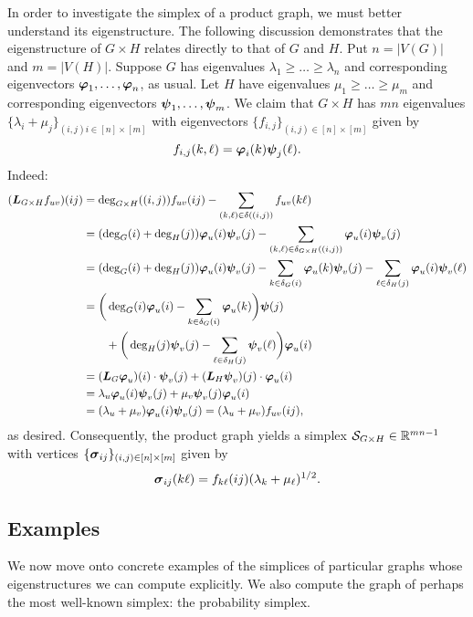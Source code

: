 In order to investigate the simplex of a product graph, we must better understand its eigenstructure. The following discussion demonstrates that the eigenstructure of $G\times H$ relates directly to that of $G$ and $H$. Put $n=|V(G)|$ and $m=|V(H)|$. Suppose $G$ has eigenvalues $\lambda_1\geq \dots\geq \lambda_{n}$ and corresponding eigenvectors $\vb*{\varphi}_1,\dots,\vb*{\varphi}_{n}$, as usual. Let $H$ have eigenvalues $\mu_1\geq \dots\geq \mu_{m}$ and corresponding eigenvectors $\vb*{\psi}_1,\dots,\vb*{\psi}_{m}$. 
We claim that $G\times H$ has $mn$ eigenvalues $\{\lambda_i+\mu_j\}_{(i,j)i\in[n]\times[m]}$ with eigenvectors $\{f_{i,j}\}_{(i,j)\in[n]\times[m]}$ given by 
\[f_{i,j}(k,\ell) = \vb*{\varphi}_i(k)\vb*{\psi}_j(\ell).\]
Indeed: 
\begin{align*}
(\vb*{L}_{G\times H} f_{uv})(ij) &= \deg_{G\times H}((i,j))f_{uv}(ij) - \sum_{(k,\ell)\in \delta((i,j))} f_{uv}(k\ell) \\
&= (\deg_G(i)+\deg_H(j))\vb*{\varphi}_u(i)\vb*{\psi}_v(j) - \sum_{(k,\ell)\in \delta_{G\times H}((i,j))} \vb*{\varphi}_u(i)\vb*{\psi}_v(j) \\
&= (\deg_G(i)+\deg_H(j))\vb*{\varphi}_u(i)\vb*{\psi}_v(j) - \sum_{k\in \delta_G(i)} \vb*{\varphi}_u(k)\vb*{\psi}_v(j) - \sum_{\ell\in \delta_H(j)} \vb*{\varphi}_u(i)\vb*{\psi}_v(\ell) \\
&=\bigg(\deg_G(i)\vb*{\varphi}_u(i) - \sum_{k\in\delta_G(i)}\vb*{\varphi}_u(k)\bigg)\vb*{\psi}(j) \\
&\qquad + \bigg(\deg_H(j)\vb*{\psi}_v(j)-\sum_{\ell\in\delta_H(j)}\vb*{\psi}_v(\ell)\bigg)\vb*{\varphi}_u(i) \\
&= (\vb*{L}_G \vb*{\varphi}_u)(i) \cdot \vb*{\psi}_v(j) + (\vb*{L}_H\vb*{\psi}_v)(j)\cdot \vb*{\varphi}_u(i) \\
&= \lambda_u\vb*{\varphi}_u(i) \vb*{\psi}_v(j) + \mu_v\vb*{\psi}_v(j)\vb*{\varphi}_u(i) \\
&= (\lambda_u+\mu_v)\vb*{\varphi}_u(i)\vb*{\psi}_v(j) = (\lambda_u+\mu_v)f_{uv}(ij),
\end{align*}
as desired. Consequently, the product graph yields a simplex $\mathcal{S}_{G\times H}\in\mathbb{R}^{mn-1}$ with vertices $\{\vb*{\sigma}_{ij}\}_{(i,j)\in[n]\times[m]}$ given by 
\[\vb*{\sigma}_{ij}(k\ell)=f_{k\ell}(ij)(\lambda_k+\mu_\ell)^{1/2}.\]


\subsection{Examples}
\label{sec:examples}

We now move onto concrete examples of the simplices of particular graphs whose eigenstructures we can compute explicitly. We also compute the graph of perhaps the most well-known simplex:  the probability simplex. 

